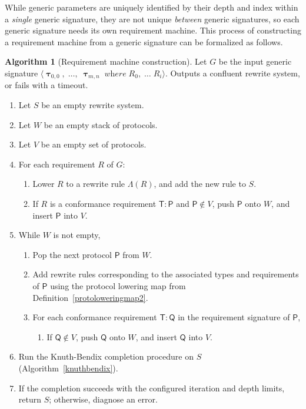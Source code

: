 \documentclass[headsepline,bibliography=totoc]{scrreport}
\newcommand{\namesym}[1]{\mathsf{#1}}
\newcommand{\proto}[1]{\bm{\mathsf{#1}}}
\newcommand{\gensig}[2]{\langle #1\;\textit{where}\;#2\rangle}
\newcommand{\genericsym}[2]{\bm{\uptau}_{#1,#2}}
\theoremstyle{definition}
\theoremstyle{definition}
\theoremstyle{definition}
\newtheorem{algorithm}{Algorithm}[chapter]
\begin{document}
While generic parameters are uniquely identified by their depth and index within a \emph{single} generic signature, they are not unique \emph{between} generic signatures, so each generic signature needs its own requirement machine. This process of constructing a requirement machine from a generic signature can be formalized as follows.
\begin{algorithm}[Requirement machine construction]\label{rqmalgo}
Let $G$ be the input generic signature $\gensig{\genericsym{0}{0},\;\ldots,\;\genericsym{m}{n}}{R_0,\;\ldots\;R_i}$. Outputs a confluent rewrite system, or fails with a timeout.
\begin{enumerate}
\item Let $S$ be an empty rewrite system.
\item Let $W$ be an empty stack of protocols.
\item Let $V$ be an empty set of protocols.
\item For each requirement $R$ of $G$:
\begin{enumerate}
\item Lower $R$ to a rewrite rule $\Lambda(R)$, and add the new rule to $S$. 
\item If $R$ is a conformance requirement $\namesym{T}\colon\proto{P}$ and $\proto{P}\notin V$, push $\proto{P}$ onto $W$, and insert $\proto{P}$ into $V$.
\end{enumerate}
\item While $W$ is not empty,
\begin{enumerate}
\item Pop the next protocol $\proto{P}$ from $W$.
\item Add rewrite rules corresponding to the associated types and requirements of $\proto{P}$ using the protocol lowering map from Definition~\ref{protoloweringmap2}. 
\item For each conformance requirement $\namesym{T}\colon\proto{Q}$ in the requirement signature of $\proto{P}$,
\begin{enumerate}
\item If $\proto{Q}\notin V$, push $\proto{Q}$ onto $W$, and insert $\proto{Q}$ into $V$.
\end{enumerate}
\end{enumerate}
\item Run the Knuth-Bendix completion procedure on $S$ (Algorithm~\ref{knuthbendix}).
\item If the completion succeeds with the configured iteration and depth limits, return $S$; otherwise, diagnose an error.
\end{enumerate}
\end{algorithm}
\end{document}
